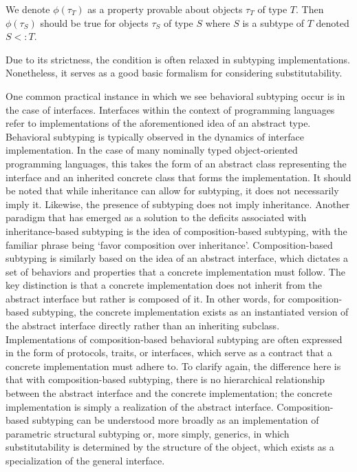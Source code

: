 \begin{definition}
 We denote $\phi (\tau_T)$ as a property provable about objects $\tau_T$ of type $T$. Then $\phi (\tau_S)$ should be true for objects $\tau_S$ of type $S$ where $S$ is a subtype of $T$ denoted $S <: T$. \cite{10.1145/197320.197383}
  
Due to its strictness, the condition is often relaxed in subtyping implementations. Nonetheless, it serves as a good basic formalism for considering substitutability.
\end{definition}  

One common practical instance in which we see behavioral subtyping occur is in the case of interfaces. Interfaces within the context of programming languages refer to implementations of the aforementioned idea of an abstract type. Behavioral subtyping is typically observed in the dynamics of interface implementation. In the case of many nominally typed object-oriented programming languages, this takes the form of an abstract class representing the interface and an inherited concrete class that forms the implementation. It should be noted that while inheritance can allow for subtyping, it does not necessarily imply it. Likewise, the presence of subtyping does not imply inheritance. Another paradigm that has emerged as a solution to the deficits associated with inheritance-based subtyping is the idea of composition-based subtyping, with the familiar phrase being `favor composition over inheritance'. Composition-based subtyping is similarly based on the idea of an abstract interface, which dictates a set of behaviors and properties that a concrete implementation must follow. The key distinction is that a concrete implementation does not inherit from the abstract interface but rather is composed of it. In other words, for composition-based subtyping, the concrete implementation exists as an instantiated version of the abstract interface directly rather than an inheriting subclass. Implementations of composition-based behavioral subtyping are often expressed in the form of protocols, traits, or interfaces, which serve as a contract that a concrete implementation must adhere to. To clarify again, the difference here is that with composition-based subtyping, there is no hierarchical relationship between the abstract interface and the concrete implementation; the concrete implementation is simply a realization of the abstract interface. Composition-based subtyping can be understood more broadly as an implementation of parametric structural subtyping or, more simply, generics, in which substitutability is determined by the structure of the object, which exists as a specialization of the general interface. 

